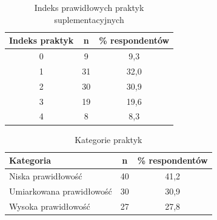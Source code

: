 
\begin{table}[H]
    \centering
    \caption{Indeks prawidłowych praktyk suplementacyjnych}
    \label{tab:indeks-praktyk}
    \begin{tabular}{|c|c|c|}
        \hline
        \textbf{Indeks praktyk} & \textbf{n}  & \textbf{\% respondentów} \\
        \hline
        \hline
        0 & 9 & 9,3 \\
        \hline
        1 & 31 & 32,0 \\
        \hline
        2 & 30 & 30,9 \\
        \hline
        3 & 19 & 19,6 \\
        \hline
        4 & 8 & 8,3 \\
        \hline
    \end{tabular}
\end{table}



\begin{table}[H]
    \centering
    \caption{Kategorie praktyk}
    \label{tab:kategorie-praktyk}
    \begin{tabular}{|l|c|c|}
        \hline
        \textbf{Kategoria} & \textbf{n} & \textbf{\% respondentów} \\
        \hline
        \hline
        Niska prawidłowość & 40 & 41,2 \\
        \hline
        Umiarkowana prawidłowość & 30 & 30,9 \\
        \hline
        Wysoka prawidłowość & 27 & 27,8 \\
        \hline
    \end{tabular}
\end{table}


